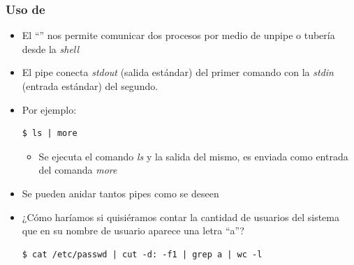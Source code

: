 \begin{frame}[fragile]
  	\frametitle{Uso de \textbf{\textbar}}
  	\begin{itemize}
		\item El ``\textbar'' nos permite comunicar dos procesos 
		por medio de unpipe o tubería desde la \emph{shell}
		\item El pipe conecta \textit{stdout} (salida estándar) del primer comando con la \textit{stdin} (entrada estándar) del segundo.
		\item Por ejemplo:	
		\begin{lstlisting}
$ ls | more
		\end{lstlisting}
		\begin{itemize}			
			\item Se ejecuta el comando \emph{ls} y la salida del mismo, es enviada como entrada del comanda \emph{more}
		\end{itemize}
		\item Se pueden anidar tantos pipes como se deseen
		\item ¿Cómo haríamos si quisiéramos contar la cantidad de usuarios del sistema que en su nombre de usuario aparece una letra ``a''?
		\pause
		\begin{lstlisting}
$ cat /etc/passwd | cut -d: -f1 | grep a | wc -l
		\end{lstlisting}
  	\end{itemize}
\end{frame}